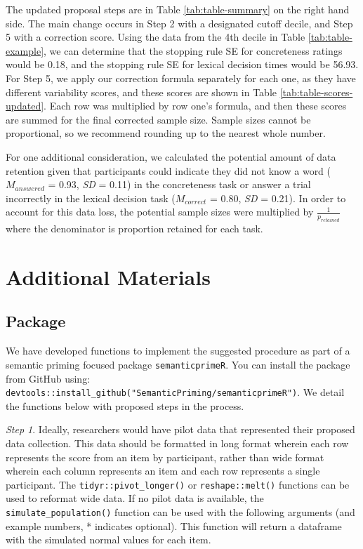 \documentclass[
  man]{apa7}
\begin{document}
The updated proposal steps are in Table \ref{tab:table-summary} on the right hand side. The main change occurs in Step 2 with a designated cutoff decile, and Step 5 with a correction score. Using the data from the 4th decile in Table \ref{tab:table-example}, we can determine that the stopping rule SE for concreteness ratings would be 0.18, and the stopping rule SE for lexical decision times would be 56.93. For Step 5, we apply our correction formula separately for each one, as they have different variability scores, and these scores are shown in Table \ref{tab:table-scores-updated}. Each row was multiplied by row one's formula, and then these scores are summed for the final corrected sample size. Sample sizes cannot be proportional, so we recommend rounding up to the nearest whole number.

For one additional consideration, we calculated the potential amount of data retention given that participants could indicate they did not know a word (\(M_{answered}\) = 0.93, \emph{SD} = 0.11) in the concreteness task or answer a trial incorrectly in the lexical decision task (\(M_{correct}\) = 0.80, \emph{SD} = 0.21). In order to account for this data loss, the potential sample sizes were multiplied by \(\frac{1}{p_{retained}}\) where the denominator is proportion retained for each task.

\section{Additional Materials}\label{additional-materials}

\subsection{Package}\label{package}

We have developed functions to implement the suggested procedure as part of a semantic priming focused package \texttt{semanticprimeR}. You can install the package from GitHub using: \texttt{devtools::install\_github("SemanticPriming/semanticprimeR")}. We detail the functions below with proposed steps in the process.

\emph{Step 1}. Ideally, researchers would have pilot data that represented their proposed data collection. This data should be formatted in long format wherein each row represents the score from an item by participant, rather than wide format wherein each column represents an item and each row represents a single participant. The \texttt{tidyr::pivot\_longer()} or \texttt{reshape::melt()} functions can be used to reformat wide data. If no pilot data is available, the \texttt{simulate\_population()} function can be used with the following arguments (and example numbers, * indicates optional). This function will return a dataframe with the simulated normal values for each item.
\end{document}
